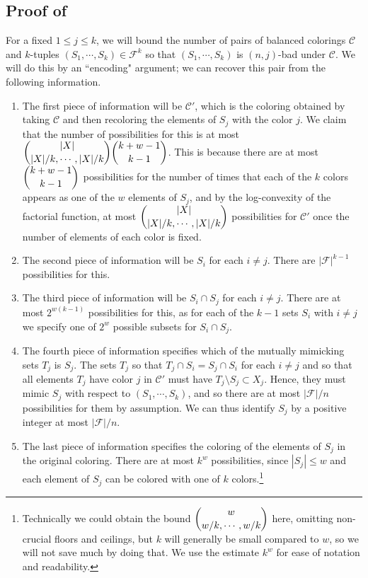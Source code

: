 \documentclass[12pt]{article}
\newcommand{\F}{\mathcal{F}}
\newcommand{\C}{\mathcal{C}}
\begin{document}
\subsection{Proof of }
\label{pfcolorup}
For a fixed $1 \le j \le k$, we will bound the number of pairs of balanced colorings $\C$ and $k$-tuples $(S_1, \cdots, S_k) \in \F^k$ so that $(S_1, \cdots, S_k)$ is $(n,j)$-bad under $\C$. We will do this by an ``encoding" argument; we can recover this pair from the following information.
\begin{enumerate}
\item 
\label{color} 
The first piece of information will be $\C'$, which is the coloring obtained by taking $\C$ and then recoloring the elements of $S_j$ with the color $j$. We claim that the number of possibilities for this is at most $\dbinom{|X|}{|X|/k, \cdots, |X|/k}\dbinom{k+w-1}{k-1}$.  This is because there are at most $\dbinom{k+w-1}{k-1}$ possibilities for the number of times that each of the $k$ colors appears as one of the $w$ elements of $S_j$, and by the log-convexity of the factorial function, at most $\dbinom{|X|}{|X|/k, \cdots, |X|/k}$ possibilities for $\C'$ once the number of elements of each color is fixed.
\item 
\label{othersets}
The second piece of information will be $S_i$ for each $i \neq j$.  There are $|\F|^{k-1}$ possibilities for this.
\item 
\label{cap}
The third piece of information will be $S_i \cap S_j$ for each $i \neq j$.  There are at most $2^{w(k-1)}$ possibilities for this, as for each of the $k-1$ sets $S_i$ with $i \neq j$ we specify one of $2^w$ possible subsets for $S_i \cap S_j$.
\item 
\label{index1}
The fourth piece of information specifies which of the mutually mimicking sets $T_j$ is $S_j$.  The sets $T_j$ so that $T_j \cap S_i=S_j \cap S_i$ for each $i \neq j$ and so that all elements $T_j$ have color $j$ in $\C'$ must have $T_j \setminus S_j \subset X_j$.  Hence, they must mimic $S_j$ with respect to $(S_1, \cdots, S_k)$, and so there are at most $|\F|/n$ possibilities for them by assumption.  We can thus identify $S_j$ by a positive integer at most $|\F|/n$.
\item
\label{index2}
The last piece of information specifies the coloring of the elements of $S_j$ in the original coloring.  There are at most $k^w$ possibilities, since $|S_j| \le w$ and each element of $S_j$ can be colored with one of $k$ colors.\footnote{Technically we could obtain the bound $\dbinom{w}{w/k, \cdots, w/k}$ here, omitting non-crucial floors and ceilings, but $k$ will generally be small compared to $w$, so we will not save much by doing that.  We use the estimate $k^w$ for ease of notation and readability.}
\end{enumerate}
\end{document}
